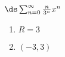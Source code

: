 {$\ds\sum_{n=0}^\infty \frac{n}{3^n}x^{n}$
}
{\begin{enumerate}
	\item $R=3$
	\item	$(-3,3)$
\end{enumerate}
}